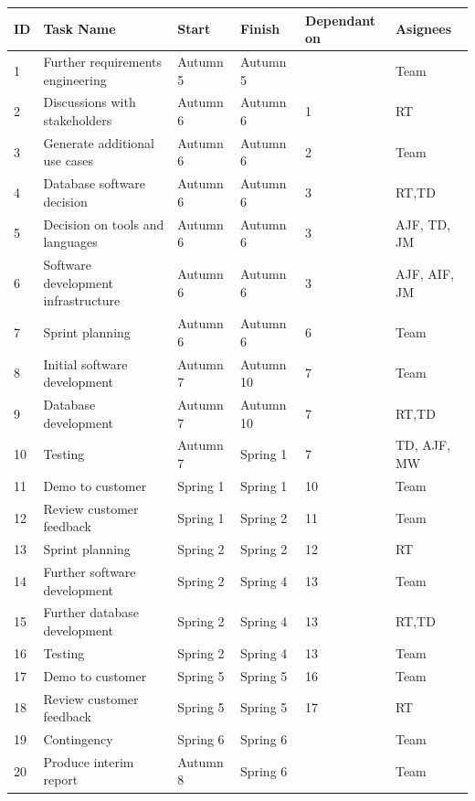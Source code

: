\begin{longtable}{|p{0.6cm}|p{5.7cm}|p{1.35cm}|p{1.35cm}|p{1.8cm}|p{1.5cm}|}
	\hline
	\rowcolor{titleColor} \textbf{ID} & \textbf{Task Name} & \textbf{Start} & \textbf{Finish} & \textbf{Dependant on} & \textbf{Asignees} \\ \hline
	1 & Further requirements engineering & Autumn 5 & Autumn 5 &  & Team \\ \hline
	2 & Discussions with stakeholders & Autumn 6 & Autumn 6 & 1 & RT \\ \hline
	3 & Generate additional use cases & Autumn 6 & Autumn 6 & 2 & Team \\ \hline
	4 & Database software decision & Autumn 6 &  Autumn 6 &  3 & RT,TD \\ \hline
	5 & Decision on tools and languages & Autumn 6 & Autumn 6 & 3 & AJF, TD, JM \\ \hline
	6 & Software development infrastructure & Autumn 6 & Autumn 6 & 3 & AJF, AIF, JM \\ \hline
	7 & Sprint planning & Autumn 6 & Autumn 6 & 6 & Team \\ \hline
	8 & Initial software development & Autumn 7 & Autumn 10 & 7 & Team \\ \hline
	9 & Database development & Autumn 7 & Autumn 10 & 7 & RT,TD \\ \hline
	10 & Testing & Autumn 7 & Spring 1 & 7 & TD, AJF, MW \\ \hline
	11 & Demo to customer & Spring 1 & Spring 1 & 10 & Team \\ \hline
	12 & Review customer feedback & Spring 1 & Spring 2 & 11 & Team\\ \hline
	13 & Sprint planning & Spring 2 & Spring 2 & 12 & RT \\ \hline
	14 & Further software development & Spring 2 &  Spring 4& 13 & Team \\ \hline
	15 & Further database development & Spring 2 & Spring 4 & 13 & RT,TD \\ \hline
	16 & Testing & Spring 2 & Spring 4 & 13 & Team \\ \hline
	17 & Demo to customer & Spring 5 & Spring 5 & 16 & Team \\ \hline
	18 & Review customer feedback & Spring 5 & Spring 5 & 17 & RT \\ \hline
	19 & Contingency & Spring 6 & Spring 6 &  & Team \\ \hline
	20 & Produce interim report & Autumn 8 & Spring 6 & & Team \\ \hline
\end{longtable}

